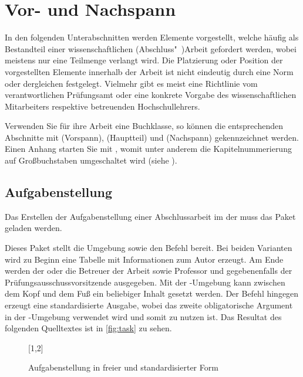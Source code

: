 \documentclass[%
  english,ngerman,%
  geometry=no,DIV=12,automark,%
]{tudscrartcl}
\begin{document}
\section{Vor- und Nachspann}
In den folgenden Unterabschnitten werden Elemente vorgestellt, welche häufig 
als Bestandteil einer wissenschaftlichen (Abschluss"~)Arbeit gefordert werden, 
wobei meistens nur eine Teilmenge verlangt wird. Die Platzierung oder Position 
der vorgestellten Elemente innerhalb der Arbeit ist nicht eindeutig durch eine 
Norm oder dergleichen festgelegt. Vielmehr gibt es meist eine Richtlinie vom 
verantwortlichen Prüfungsamt oder eine konkrete Vorgabe des wissenschaftlichen 
Mitarbeiters respektive betreuenden Hochschullehrers.

Verwenden Sie für ihre Arbeit eine Buchklasse, so können die entsprechenden 
Abschnitte mit  (Vorspann),  (Hauptteil) 
und  (Nachspann) gekennzeichnet werden. Einen Anhang starten 
Sie mit , womit unter anderem die Kapitelnummerierung auf 
Großbuchstaben umgeschaltet wird (siehe \scrguide*).


\subsection{Aufgabenstellung}
\label{sec:task}
Das Erstellen der Aufgabenstellung einer Abschlussarbeit im \CD der \TnUD muss 
das Paket  geladen werden.
%
\begin{Preamble}
\usepackage{tudscrsupervisor}

\end{Preamble}
%
Dieses Paket stellt die Umgebung  sowie den Befehl 
 bereit. Bei beiden Varianten wird zu Beginn eine Tabelle mit 
Informationen zum Autor erzeugt. Am Ende werden der oder die Betreuer der 
Arbeit sowie Professor und gegebenenfalls der Prüfungsausschussvorsitzende 
ausgegeben. Mit der -Umgebung kann zwischen dem Kopf und dem 
Fuß ein beliebiger Inhalt gesetzt werden. Der Befehl  hingegen 
erzeugt eine standardisierte Ausgabe, wobei das zweite obligatorische Argument 
in der -Umgebung verwendet wird und somit  zu 
nutzen ist. Das Resultat des folgenden Quelltextes ist in \autoref{fig:task} zu 
sehen. 
%
\begin{figure}
[1,2]
\caption{Aufgabenstellung in freier und standardisierter Form}
\label{fig:task}
\end{figure}
\end{document}
